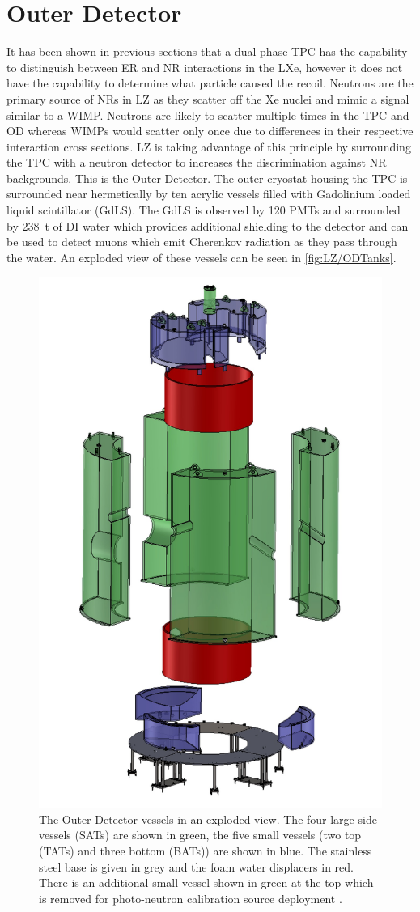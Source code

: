 \section{Outer Detector}\label{sec:LZ/LZOD}
It has been shown in previous sections that a dual phase TPC has the capability to distinguish between ER and NR interactions in the LXe, however it does not have the capability to determine what particle caused the recoil. Neutrons are the primary source of NRs in LZ as they scatter off the Xe nuclei and mimic a signal similar to a WIMP. Neutrons are likely to scatter multiple times in the TPC and OD whereas WIMPs would scatter only once due to differences in their respective interaction cross sections. LZ is taking advantage of this principle by surrounding the TPC with a neutron detector to increases the discrimination against NR backgrounds. This is the Outer Detector.
The outer cryostat housing the TPC is surrounded near hermetically by ten acrylic vessels filled with  Gadolinium loaded liquid scintillator (GdLS). The GdLS is observed by 120 PMTs and surrounded by 238~t of DI water which provides additional shielding to the detector and can be used to detect muons which emit Cherenkov radiation as they pass through the water. An exploded view of these vessels can be seen in \autoref{fig:LZ/ODTanks}.
\begin{figure}[!ht]
    \centering
    \includegraphics[width=0.5\linewidth]{figures/LZ/CAD_ODTanks.jpg}
    \caption{The Outer Detector vessels in an exploded view. The four large side vessels (SATs) are shown in green, the five small vessels (two top (TATs) and three bottom (BATs)) are shown in blue. The stainless steel base is given in grey and the foam water displacers in red. There is an additional small vessel shown in green at the top which is removed for photo-neutron calibration source deployment \cite{LZNIMA}.}
    \label{fig:LZ/ODTanks}
\end{figure}

